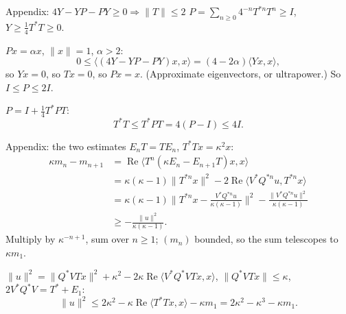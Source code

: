 \documentclass[14pt]{beamer}
\newcommand{\norm}[1]{\lVert #1\rVert}
\newcommand{\ip}[2]{\langle #1,#2\rangle}
\DeclareMathOperator{\re}{Re}
\begin{document}
\begin{frame}{Appendix: $4Y-YP-PY\ge0\Rightarrow\norm{T}\le2$}
  $P=\sum_{n\ge0}4^{-n}T^{*n}T^n\ge I$, $Y\ge\tfrac14T^*T\ge0$.

  \medskip
  $Px=\alpha x$, $\norm x=1$, $\alpha>2$:
  \[
    0\le\ip{(4Y-YP-PY)x}{x}=(4-2\alpha)\ip{Yx}{x},
  \]
  so $Yx=0$, so $Tx=0$, so $Px=x$.
  (Approximate eigenvectors, or ultrapower.) So $I\le P\le2I$.

  \medskip
  $P=I+\tfrac14T^*PT$:
  \[
    T^*T\le T^*PT=4(P-I)\le4I .
  \]
\end{frame}

\begin{frame}{Appendix: the two estimates}
  \small
  $E_nT=TE_n$, $T^*Tx=\kappa^2x$:
  \begin{align*}
    \kappa m_n-m_{n+1}
    &=\re\ip{T^n(\kappa E_n-E_{n+1}T)x}{x}\\
    &=\kappa(\kappa-1)\norm{T^{*n}x}^2-2\re\ip{V^*Q^{*n}u}{T^{*n}x}\\
    &=\kappa(\kappa-1)\Big\|T^{*n}x-\frac{V^*Q^{*n}u}{\kappa(\kappa-1)}\Big\|^2-\frac{\norm{V^*Q^{*n}u}^2}{\kappa(\kappa-1)}\\
    &\ge-\frac{\norm{u}^2}{\kappa(\kappa-1)} .
  \end{align*}
  Multiply by $\kappa^{-n+1}$, sum over $n\ge1$; $(m_n)$ bounded, so the sum telescopes to $\kappa m_1$.

  \medskip
  $\norm{u}^2=\norm{Q^*VTx}^2+\kappa^2-2\kappa\re\ip{V^*Q^*VTx}{x}$, $\norm{Q^*VTx}\le\kappa$, $2V^*Q^*V=T^*+E_1$:
  \[
    \norm{u}^2\le2\kappa^2-\kappa\re\ip{T^*Tx}{x}-\kappa m_1=2\kappa^2-\kappa^3-\kappa m_1 .
  \]
\end{frame}
\end{document}
